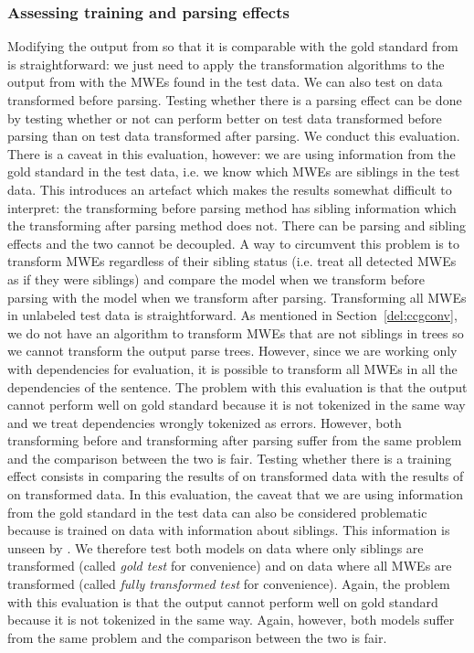 \documentclass[output=paper]{langsci/langscibook}
\begin{document}
    \subsubsection{Assessing training and parsing effects}
    \label{del:evalB}
    \indent Modifying the output from {\modelA} so that it is comparable with the gold standard from {\modelB} is straightforward: we just need to apply the transformation algorithms to the output from {\modelA} with the MWEs found in the test data. We can also test {\modelA} on data transformed before parsing.
    Testing whether there is a parsing effect can be done by testing whether or not {\modelA} can perform better on test data transformed before parsing than on test data transformed after parsing. We conduct this evaluation. There is a caveat in this evaluation, however: we are using information from the gold standard in the test data, i.e. we know which MWEs are siblings in the test data. This introduces an artefact which makes the results somewhat difficult to interpret: the transforming before parsing method has sibling information which the transforming after parsing method does not. There can be parsing and sibling effects and the two cannot be decoupled. A way to circumvent this problem is to transform MWEs regardless of their sibling status (i.e. treat all detected MWEs as if they were siblings) and compare the model when we transform before parsing with the model when we transform after parsing. Transforming all MWEs in unlabeled test data is straightforward. As mentioned in Section~\ref{del:ccgconv}, we do not have an algorithm to transform MWEs that are not siblings in trees so we cannot transform the output parse trees. However, since we are working only with dependencies for evaluation, it is possible to transform all MWEs in all the dependencies of the sentence. The problem with this evaluation is that the output cannot perform well on gold standard because it is not tokenized in the same way and we treat dependencies wrongly tokenized as errors. However, both transforming before and transforming after parsing suffer from the same problem and the comparison between the two is fair. 
    Testing whether there is a training effect consists in comparing the results of {\modelA} on transformed data with the results of {\modelB} on transformed data. In this evaluation, the caveat that we are using information from the gold standard in the test data can also be considered problematic because {\modelB} is trained on data with information about siblings. This information is unseen by {\modelA}. We therefore test both models on data where only siblings are transformed (called \textit{gold test} for convenience) and on data where all MWEs are transformed (called \textit{fully transformed test} for convenience). Again, the problem with this evaluation is that the output cannot perform well on gold standard because it is not tokenized in the same way. Again, however, both models suffer from the same problem and the comparison between the two is fair.
\end{document}
